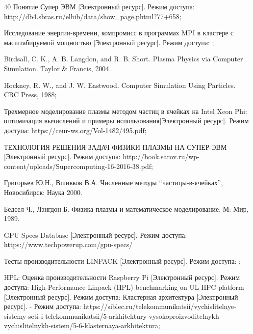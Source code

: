 \documentclass{article}
\begin{document}
\begin{thebibliography} {40}
Понятие Супер ЭВМ [Электронный ресурс]. Режим доступа: http://db4.sbras.ru/elbib/data/show_page.phtml?77+658;

Исследование энергии-времени, компромисс в программах MPI в кластере с масштабируемой мощностью [Электронный ресурс].
Режим доступа: \href{https://dkl.cs.arizona.edu/publications/papers/ipdps05.pdf};

Birdsall, C. K., A. B. Langdon, and R. B. Short. Plasma Physics via Computer Simulation. Taylor \& Francis, 2004.

Hockney, R. W., and J. W. Eastwood. Computer Simulation Using Particles. CRC Press, 1988;

Трехмерное моделирование плазмы методом частиц в
ячейках на Intel Xeon Phi: оптимизация вычислений и примеры использования[Электронный ресурс]. Режим доступа: https://ceur-ws.org/Vol-1482/495.pdf;

ТЕХНОЛОГИЯ РЕШЕНИЯ ЗАДАЧ ФИЗИКИ ПЛАЗМЫ НА СУПЕР-ЭВМ [Электронный ресурс]. Режим доступа: http://book.sarov.ru/wp-content/uploads/Supercomputing-16-2016-38.pdf;

Григорьев Ю.Н., Вшивков В.А. Численные методы “частицы-в-ячейках”, Новосибирск: Наука 2000.

Бедсел Ч., Лэнгдон Б. Физика плазмы и математическое моделирование. М: Мир, 1989.

GPU Specs Database [Электронный ресурс]. Режим доступа: https://www.techpowerup.com/gpu-specs/

Тесты производительности LINPACK [Электронный ресурс].
Режим доступа: \href{https://ru.wikipedia.org/wiki/\%D0\%A2\%D0\%B5\%D1\%81\%D1\%82\%D1\%8B_\%D0\%BF\%D1\%80\%D0\%BE\%D0\%B8\%D0\%B7\%D0\%B2\%D0\%BE\%D0\%B4\%D0\%B8\%D1\%82\%D0\%B5\%D0\%BB\%D1\%8C\%D0\%BD\%D0\%BE\%D1\%81\%D1\%82\%D0\%B8_LINPACK};

HPL: Оценка производительности Raspberry Pi [Электронный ресурс]. Режим доступа: \href{https://drach.pro/blog/linux/item/88-hpl-raspberry-pi-stress}

High-Performance Linpack (HPL) benchmarking on UL HPC platform [Электронный ресурс]. Режим доступа: \href{https://ulhpc-tutorials.readthedocs.io/en/latest/parallel/mpi/HPL/}

Кластерная архитектура [Электронный ресурс].
   - Режим доступа: https://siblec.ru/telekommunikatsii/vychislitelnye-sistemy-seti-i-telekommunikatsii/5-arkhitektury-vysokoproizvoditelnykh-vychislitelnykh-sistem/5-6-klasternaya-arkhitektura;


\end{thebibliography}
\end{document}
